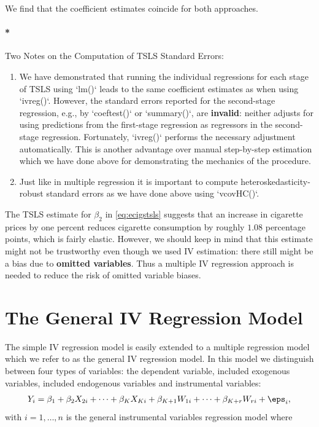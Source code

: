 \documentclass[
  letterpaper,
  DIV=11,
  numbers=noendperiod]{scrreprt}
\let\oldparagraph\paragraph
\renewcommand{\paragraph}[1]{\oldparagraph{#1}\mbox{}}
\theoremstyle{definition}
\theoremstyle{plain}
\theoremstyle{plain}
\theoremstyle{remark}
\begin{document}
{We find that the coefficient estimates coincide for both approaches.

\paragraph*{Two Notes on the Computation of TSLS Standard Errors:}
\begin{enumerate}
\item We have demonstrated that running the individual regressions for each stage of TSLS using `lm()` leads to the same coefficient estimates as when using `ivreg()`. However, the standard errors reported for the second-stage regression, e.g., by `coeftest()` or `summary()`, are \textbf{invalid}: neither adjusts for using predictions from the first-stage regression as regressors in the second-stage regression. Fortunately, `ivreg()` performs the necessary adjustment automatically. This is another advantage over manual step-by-step estimation which we have done above for demonstrating the mechanics of the procedure.
\item Just like in multiple regression it is important to compute heteroskedasticity-robust standard errors as we have done above using `vcovHC()`.
\end{enumerate}

The TSLS estimate for \(\beta_2\) in \eqref{eq:ecigstsls} suggests that
an increase in cigarette prices by one percent reduces cigarette
consumption by roughly \(1.08\) percentage points, which is fairly
elastic. However, we should keep in mind that this estimate might not be
trustworthy even though we used IV estimation: there still might be a
bias due to \textbf{omitted variables}. Thus a multiple IV regression
approach is needed to reduce the risk of omitted variable biases.

\hypertarget{TGIVRM}{%
\section{The General IV Regression Model}\label{TGIVRM}}

The simple IV regression model is easily extended to a multiple
regression model which we refer to as the general IV regression model.
In this model we distinguish between four types of variables: the
dependent variable, included exogenous variables, included endogenous
variables and instrumental variables: \begin{align}
  Y_i = \beta_1 + \beta_2 X_{2i} + \dots + \beta_K X_{Ki} + \beta_{K+1} W_{1i} + \dots + \beta_{K+r} W_{ri} + \eps_i, \label{eq:givmodel}
\end{align} with \(i=1,\dots,n\) is the general instrumental variables
regression model where

}
\end{document}
